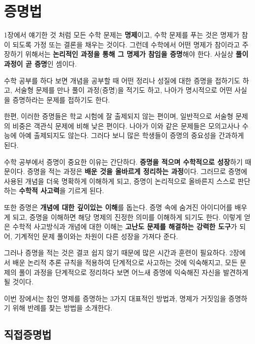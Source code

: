 \chapter{증명법}

1장에서 얘기한 것 처럼 모든 수학 문제는 \textbf{명제}이고, 수학 문제를 푸는 것은 명제가 참이 되도록 가정 또는 결론을 채우는 것이다. 그런데 수학에서 어떤 명제가 참이라고 주장하기 위해서는 \textbf{논리적인 과정을 통해 그 명제가 참임을 증명}해야 한다. 사실상 \textbf{풀이 과정이 곧 증명}인 셈이다.

수학 공부를 하다 보면 개념을 공부할 때 어떤 정리나 성질에 대한 증명을 접하기도 하고, 서술형 문제를 만나 풀이 과정(증명)을 적기도 하고, 나아가 명시적으로 어떤 사실을 증명하라는 문제를 접하기도 한다.

한편, 이러한 증명들은 학교 시험에 잘 출제되지 않는 편이며, 일반적으로 서술형 문제의 비중은 객관식 문제에 비해 낮은 편이다. 나아가 이와 같은 문제들은 모의고사나 수능에 아예 출제되지도 않는다. 그러다 보니 많은 학생들이 증명의 중요성을 간과하게 된다.

수학 공부에서 증명이 중요한 이유는 간단하다. \textbf{증명을 적으며 수학적으로 성장}하기 때문이다. 증명을 적는 과정은 \textbf{배운 것을 올바르게 정리하는 과정}이다. 그러므로 증명에 사용된 개념을 더욱 명확하게 이해하게 되고, 증명이 논리적으로 올바른지 스스로 판단하는 \textbf{수학적 사고력}을 기르게 된다.

또한 증명은 \textbf{개념에 대한 깊이있는 이해}를 돕는다. 증명 속에 숨겨진 아이디어를 배우게 되고, 증명을 이해하면 해당 명제의 진정한 의미를 이해하게 되기도 한다. 이렇게 얻은 수학적 사고방식과 개념에 대한 이해는 \textbf{고난도 문제를 해결하는 강력한 도구}가 되어, 기계적인 문제 풀이와는 차원이 다른 성장을 가져다 준다.

그러나 증명을 적는 것은 결코 쉽지 않기 때문에 많은 시간과 훈련이 필요하다. 2장에서 배운 논리적 추론 규칙을 적용하여 단계적으로 사고하는 것에 익숙해지고, 모든 문제의 풀이 과정을 단계적으로 정리하다 보면 어느새 증명에 익숙해진 자신을 발견하게 될 것이다.

이번 장에서는 참인 명제를 증명하는 3가지 대표적인 방법과, 명제가 거짓임을 증명하기 위해 반례를 찾는 방법을 소개한다.

\section{직접증명법}



